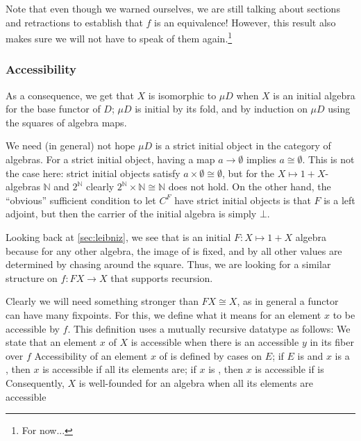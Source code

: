 Note that even though we warned ourselves, we are still talking about sections and retractions to establish that $f$ is an equivalence! However, this result also makes sure we will not have to speak of them again.\footnote{For now...}

\subsubsection{Accessibility}
As a consequence, we get that $X$ is isomorphic to $\mu D$ when $X$ is an initial algebra for the base functor of $D$; $\mu D$ is initial by its fold, and by induction on $\mu D$ using the squares of algebra maps. 

\begin{remark}
    We need (in general) not hope $\mu D$ is a strict initial object in the category of algebras. For a strict initial object, having a map $a \to \emptyset$ implies $a \cong \emptyset$. This is not the case here: strict initial objects satisfy $a \times \emptyset \cong \emptyset$, but for the $X \mapsto 1 + X$-algebras $\mathbb{N}$ and $2^\mathbb{N}$ clearly $2^\mathbb{N} \times \mathbb{N} \cong \mathbb{N}$ does not hold. On the other hand, the ``obvious'' sufficient condition to let $C^F$ have strict initial objects is that $F$ is a left adjoint, but then the carrier of the initial algebra is simply $\bot$.
\end{remark}

Looking back at \autoref{sec:leibniz}, we see that  is an initial $F: X \mapsto 1 + X$ algebra because for any other algebra, the image of  is fixed, and by  all other values are determined by chasing around the square. Thus, we are looking for a similar structure on $f : FX \to X$ that supports recursion.

Clearly we will need something stronger than $FX \cong X$, as in general a functor can have many fixpoints. For this, we define what it means for an element $x$ to be accessible by $f$. This definition uses a mutually recursive datatype as follows:
We state that an element $x$ of $X$ is accessible when there is an accessible $y$ in its fiber over $f$
Accessibility of an element $x$ of  is defined by cases on $E$; if $E$ is  and $x$ is a , then $x$ is accessible if all its elements are; if $x$ is , then $x$ is accessible if  is
Consequently, $X$ is well-founded for an algebra when all its elements are accessible

